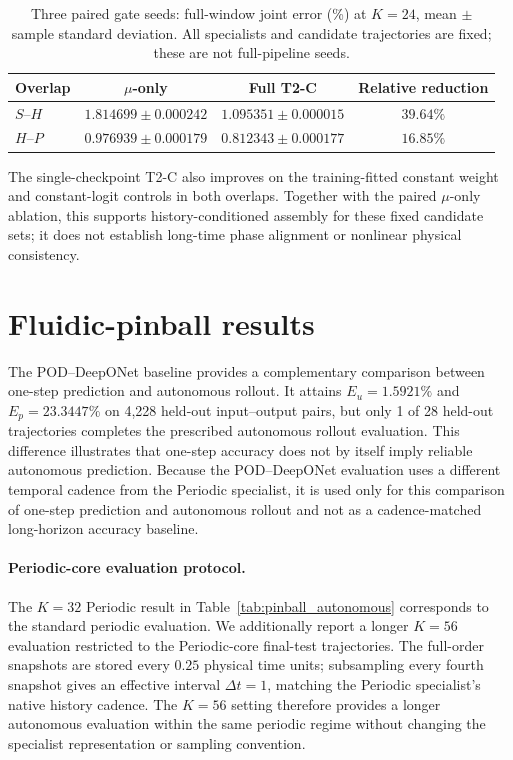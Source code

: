 \documentclass{article}
\begin{document}
\begin{table}[H]
\centering
\caption{Three paired gate seeds: full-window joint error (\%) at
$K=24$, mean $\pm$ sample standard deviation. All specialists and
candidate trajectories are fixed; these are not full-pipeline seeds.}
\label{tab:t2c_window_seeds}
\small
\begin{tabular}{@{}lccc@{}}
\toprule
Overlap & $\mu$-only & Full T2-C & Relative reduction\\
\midrule
$S$--$H$ & $1.814699\pm0.000242$ & $1.095351\pm0.000015$ & $39.64\%$\\
$H$--$P$ & $0.976939\pm0.000179$ & $0.812343\pm0.000177$ & $16.85\%$\\
\bottomrule
\end{tabular}
\end{table}

The single-checkpoint T2-C also improves on the training-fitted constant
weight and constant-logit controls in both overlaps. Together with the
paired $\mu$-only ablation, this supports history-conditioned assembly
for these fixed candidate sets; it does not establish long-time phase
alignment or nonlinear physical consistency.

\FloatBarrier
\section{Fluidic-pinball results}
\label{app:pinball}

The POD--DeepONet baseline provides a complementary comparison between
one-step prediction and autonomous rollout. It attains $E_u=1.5921\%$ and $E_p=23.3447\%$ on 4,228 held-out input--output pairs, but only 1 of 28 held-out trajectories completes the prescribed autonomous rollout evaluation. This difference illustrates that one-step accuracy does not by itself imply reliable autonomous prediction. Because the POD--DeepONet evaluation uses a different temporal cadence from
the Periodic specialist, it is used only for this comparison of one-step prediction and autonomous rollout and not as a cadence-matched long-horizon accuracy baseline.

\paragraph{Periodic-core evaluation protocol.}
The $K=32$ Periodic result in Table~\ref{tab:pinball_autonomous} corresponds to the standard periodic evaluation. We additionally report a longer $K=56$ evaluation restricted to the Periodic-core final-test trajectories. The full-order snapshots are stored every $0.25$ physical time units; subsampling every fourth snapshot gives an effective interval $\Delta t=1$, matching the Periodic specialist's native history cadence. The $K=56$ setting therefore provides a longer autonomous evaluation within the same periodic regime without changing the specialist representation or
sampling convention.
\end{document}
